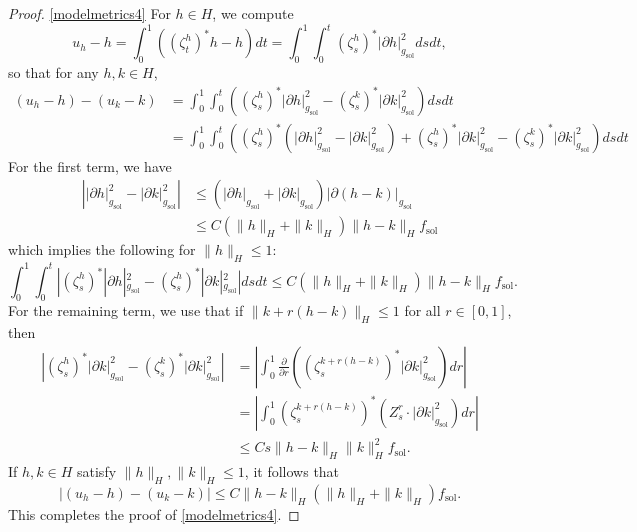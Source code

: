 \documentclass[10pt,a4paper]{amsart}
\providecommand{\sol}{\operatorname{sol}}
\begin{document}
\begin{proof}
\ref{modelmetrics4} For $h\in H$, we compute
\begin{equation*}
    u_h-h=\int_0^1((\zeta_t^h)^*h-h)dt=\int_0^1\int_0^t(\zeta_s^h)^*|\partial  h|_{g_{\sol}}^2dsdt,
\end{equation*}
so that for any $h,k\in H$, 
\begin{equation*}
  \begin{split}
        (u_h-h)-(u_k-k)&=\int_0^1\int_0^t\left((\zeta_s^h)^*|\partial h|_{g_{\sol}}^2-(\zeta_s^k)^*|\partial k|_{g_{\sol}}^2\right)dsdt\\
        &=\int_0^1\int_0^t\left((\zeta_s^h)^*(|\partial h|_{g_{\sol}}^2-|\partial k|_{g_{\sol}}^2)+(\zeta_s^h)^*|\partial k|_{g_{\sol}}^2-(\zeta_s^k)^*|\partial k|_{g_{\sol}}^2\right)dsdt
  \end{split}
\end{equation*}
For the first term, we have
\begin{equation*}
\begin{split}
     \left|  |\partial h|_{g_{\sol}}^2-|\partial k|^2_{g_{\sol}}\right|&\le ( |\partial h|_{g_{\sol}}+ |\partial k|_{g_{\sol}})|\partial(h-k)|_{g_{\sol}}\\
     &\le C(\|h\|_H+\|k\|_H)\|h-k\|_H f_{\sol}
\end{split}
\end{equation*}
which implies the following for $\|h\|_H \leq 1$:
\begin{equation*}
    \int_0^1\int_0^t|(\zeta_s^h)^*|\partial h|_{g_{\sol}}^2-(\zeta_s^h)^*|\partial k|_{g_{\sol}}^2|dsdt\le C(\|h\|_H+\|k\|_H)\|h-k\|_H f_{\sol}.
\end{equation*}
For the remaining term, we use that if $\|k+r(h-k)\|_H \leq 1$ for all $r\in[0,1]$, then
\begin{equation*}
    \begin{split}
       \left| (\zeta_s^h)^*|\partial k|_{g_{\sol}}^2-(\zeta_s^k)^*|\partial k|_{g_{\sol}}^2\right|&=\left|\int_0^1\frac{\partial}{\partial r}\left((\zeta_s^{k+r(h-k)})^*|\partial k|_{g_{\sol}}^2\right)dr\right|\\
        &=\left|\int_0^1(\zeta_s^{k+r(h-k)})^*(Z_s^r\cdot|\partial k|_{g_{\sol}}^2)dr\right|\\
        &\le Cs \|h-k\|_H\|k\|_H^2 f_{\sol}.    
    \end{split}
\end{equation*}
If $h,k\in H$ satisfy $\|h\|_H,\|k\|_H \leq 1$, it follows that
\begin{equation*}
      |(u_h-h)-(u_k-k)|\le C\|h-k\|_H(\|h\|_H+\|k\|_H)f_{\sol}.
\end{equation*}
This completes the proof of \ref{modelmetrics4}.
\end{proof}
\end{document}
